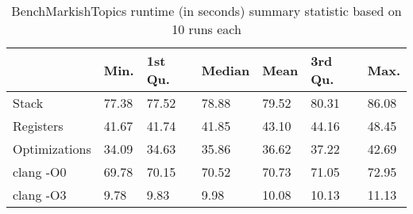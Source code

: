 \begin{table}[h!]
\centering
\begin{tabular}{p{}p{}p{}p{}p{}p{}p{}}
  \hline
 & Min. & 1st Qu. & Median & Mean & 3rd Qu. & Max. \\ 
  \hline
Stack & 77.38 & 77.52 & 78.88 & 79.52 & 80.31 & 86.08 \\ 
  Registers & 41.67 & 41.74 & 41.85 & 43.10 & 44.16 & 48.45 \\ 
  Optimizations & 34.09 & 34.63 & 35.86 & 36.62 & 37.22 & 42.69 \\ 
  clang -O0 & 69.78 & 70.15 & 70.52 & 70.73 & 71.05 & 72.95 \\ 
  clang -O3 & 9.78 & 9.83 & 9.98 & 10.08 & 10.13 & 11.13 \\ 
   \hline
\end{tabular}
\caption{BenchMarkishTopics runtime (in seconds) summary statistic based on 10 runs each}
\end{table}
